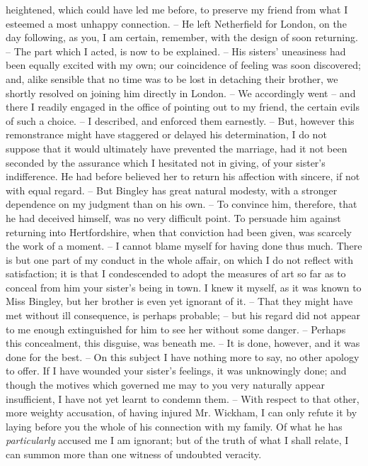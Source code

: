 \begin{letter}
heightened, which could have led me before, to
preserve my friend from what I esteemed a most unhappy
connection. -- He left Netherfield for London, on the day
following, as you, I am certain, remember, with the design
of soon returning. -- The part which I acted, is now to be
explained. -- His sisters’ uneasiness had been equally
excited with my own; our coincidence of feeling was soon
discovered; and, alike sensible that no time was to be
lost in detaching their brother, we shortly resolved on
joining him directly in London. -- We accordingly went -- and
there I readily engaged in the office of pointing out
to my friend, the certain evils of such a choice. -- I described,
and enforced them earnestly. -- But, however this
remonstrance might have staggered or delayed his determination,
I do not suppose that it would ultimately have
prevented the marriage, had it not been seconded by the
assurance which I hesitated not in giving, of your sister’s
indifference. He had before believed her to return his
affection with sincere, if not with equal regard. -- But
Bingley has great natural modesty, with a stronger dependence
on my judgment than on his own. -- To convince
him, therefore, that he had deceived himself, was no very
difficult point. To persuade him against returning into
Hertfordshire, when that conviction had been given, was
scarcely the work of a moment. -- I cannot blame myself
for having done thus much. There is but one part of my
conduct in the whole affair, on which I do not reflect
with satisfaction; it is that I condescended to adopt the
measures of art so far as to conceal from him your sister’s
being in town. I knew it myself, as it was known to
Miss Bingley, but her brother is even yet ignorant of it. --
That they might have met without ill consequence, is
perhaps probable; -- but his regard did not appear to me
enough extinguished for him to see her without some
danger. -- Perhaps this concealment, this disguise, was
beneath me. -- It is done, however, and it was done for
the best. -- On this subject I have nothing more to say,
no other apology to offer. If I have wounded your sister’s
feelings, it was unknowingly done; and though the
motives which governed me may to you very naturally
appear insufficient, I have not yet learnt to condemn
them. -- With respect to that other, more weighty accusation,
of having injured Mr. Wickham, I can only refute
it by laying before you the whole of his connection with
my family. Of what he has \textit{particularly} accused me I am
ignorant; but of the truth of what I shall relate, I can
summon more than one witness of undoubted veracity.

\end{letter}
